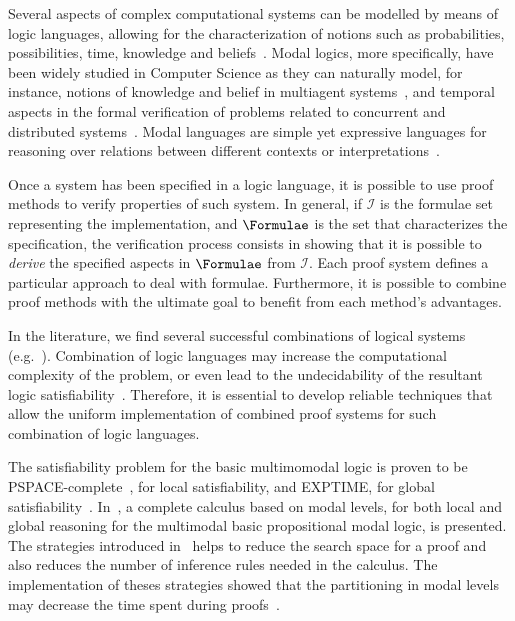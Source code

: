 Several aspects of complex computational systems can be modelled by means of
logic languages, allowing for the characterization of notions such as
probabilities, possibilities, time, knowledge and
beliefs~\cite{FHMV95,Hai82,HMM83,rao:91c}. Modal logics, more specifically, have
been widely studied in Computer Science as they can naturally model, for
instance, notions of knowledge and belief in multiagent
systems~\cite{bratman1987intention,FHMV95,rao:91c}, and temporal aspects in the
formal verification of problems related to concurrent and distributed
systems~\cite{Hai82,HMM83}. Modal languages are simple yet expressive languages
for reasoning over relations between different contexts or
interpretations~\cite{blackburn2002modal}.

Once a system has been specified in a logic language, it is possible to use
proof methods to verify properties of such system. In general, if $\mathcal{I}$
is the formulae set representing the implementation, and $\Formulae$ is the set
that characterizes the specification, the verification process consists in
showing that it is possible to \emph{derive} the specified aspects in $\Formulae$
from $\mathcal{I}$. Each proof system defines a particular approach to deal with
formulae. Furthermore, it is possible to combine proof methods with the ultimate
goal to benefit from each method's advantages. 


In the literature, we find several successful combinations of logical systems
(e.g.~\cite{hylores, ghilardi2017interpolation,
Goetzmann+Kaminski+Smolka@ENTCS2010, gutierrez2016metric}). %
Combination of logic languages may increase the computational
complexity of the problem, or even lead to the undecidability of the resultant
logic satisfiability~\cite{mdml}. Therefore, it is essential to develop
reliable techniques that allow the uniform implementation of combined proof systems
for such combination of logic languages.

The satisfiability problem for the basic multimomodal logic  is proven to be
PSPACE-complete~\cite{Spaan:coml}, for local satisfiability, and EXPTIME, for
global satisfiability~\cite{Spaan:coml}. In~\cite{nalon2015modal}, a complete
calculus based on modal levels, for both local and global reasoning for the
multimodal basic propositional modal logic, is presented. The strategies
introduced in~\cite{nalon2015modal} helps to reduce the search space for a proof
and also reduces the number of inference rules needed in the calculus. The
implementation of theses strategies showed that the partitioning in modal levels
may decrease the time spent during proofs~\cite{Nalon2016}. 

